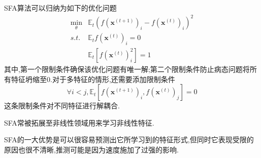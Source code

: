 SFA算法可以归纳为如下的优化问题
\begin{equation}\begin{split}
\min_{\theta}&\mathbb E_t(f(\mathbf x^{(t+1)})_i-f(\mathbf x^{(t)})_i)^2\\
s.t.&\mathbb E_tf(\mathbf x^{(t)})_i=0\\
&\mathbb E_t[f(\mathbf x^{(t)})_i^2]=1
\end{split}\end{equation}
其中,第一个限制条件确保该优化问题有唯一解;第二个限制条件防止病态问题将所有特征坍缩至$0$.对于多特征的情形,还需要添加限制条件
\begin{equation}
\forall i<j,\mathbb E_t[f(\mathbf x^{(t+1)})_i,f(\mathbf x^{(t)})_j]=0
\end{equation}
这条限制条件对不同特征进行解耦合.

SFA常被拓展至非线性领域用来学习非线性特征.

SFA的一大优势是可以很容易预测出它所学习到的特征形式,但同时它表现受限的原因也很不清晰,推测可能是因为速度施加了过强的影响.